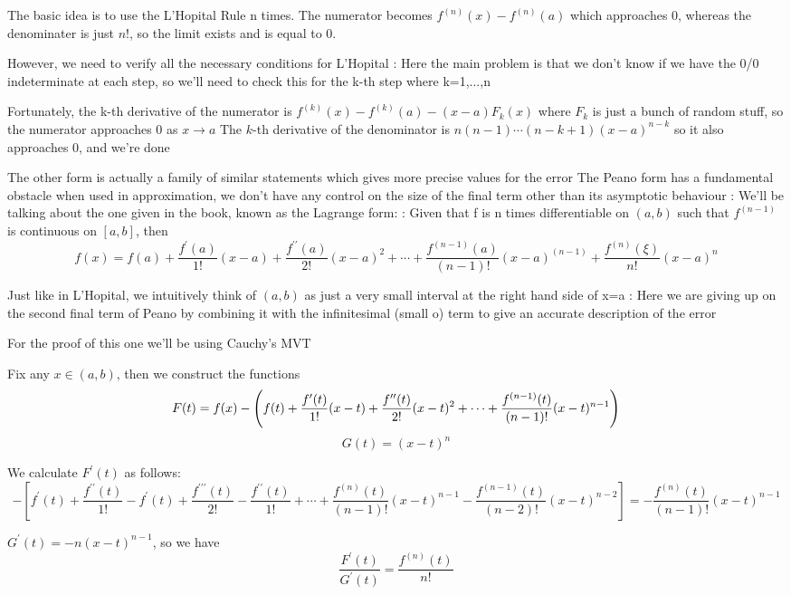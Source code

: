 The basic idea is to use the L'Hopital Rule n times. The numerator becomes $f^{(n)}(x)-f^{(n)}(a)$ which approaches $0$, whereas the denominater is just $n!$, so the limit exists and is equal to $0$.

However, we need to verify all the necessary conditions for L'Hopital
:
Here the main problem is that we don't know if we have the 0/0 indeterminate at each step, so we'll need to check this for the k-th step where k=1,...,n

Fortunately, the k-th derivative of the numerator is
$f^{(k)}(x)-f^{(k)}(a)-(x-a)F_k(x)$ where $F_k$ is just a bunch of random stuff, so the numerator approaches $0$ as $x\to a$
The $k$-th derivative of the denominator is $n(n-1)\cdots(n-k+1)(x-a)^{n-k}$ so it also approaches $0$, and we're done

The other form is actually a family of similar statements which gives more precise values for the error
The Peano form has a fundamental obstacle when used in approximation, we don't have any control on the size of the final term other than its asymptotic behaviour
:
We'll be talking about the one given in the book, known as the Lagrange form:
:
Given that f is n times differentiable on $(a,b)$ such that $f^{(n-1)}$ is continuous on $[a,b]$, then
\[ f(x)=f(a)+\frac{f^\prime(a)}{1!}(x-a)+\frac{f^{\prime\prime}(a)}{2!}(x-a)^2+\cdots+\frac{f^{(n-1)}(a)}{(n-1)!}(x-a)^(n-1)+\frac{f^{(n)}(\xi)}{n!}(x-a)^n \]

Just like in L'Hopital, we intuitively think of $(a,b)$ as just a very small interval at the right hand side of x=a
:
Here we are giving up on the second final term of Peano by combining it with the infinitesimal (small o) term to give an accurate description of the error

For the proof of this one we'll be using Cauchy's MVT

Fix any $x\in(a,b)$, then we construct the functions
\[ F(t)=f(x)-\left(f(t)+\frac{f^\prime(t)}{1!}(x-t)+\frac{f^{\prime\prime}(t)}{2!}(x-t)^2+\cdots+\frac{f^{(n-1)}(t)}{(n-1)!}(x-t)^{n-1}\right) \]
\[ G(t)=(x-t)^n \]

We calculate $F^\prime(t)$ as follows:
\[ -[f^\prime(t)+\frac{f^{\prime\prime}(t)}{1!}-f^\prime(t)+\frac{f^{\prime\prime\prime}(t)}{2!}-\frac{f^{\prime\prime}(t)}{1!}+\cdots+\frac{f^{(n)}(t)}{(n-1)!}(x-t)^{n-1}-\frac{f^{(n-1)}(t)}{(n-2)!}(x-t)^{n-2}]=-\frac{f^{(n)}(t)}{(n-1)!}(x-t)^{n-1} \]

$G^\prime(t)=-n(x-t)^{n-1}$, so we have
\[ \frac{F^\prime(t)}{G^\prime(t)}=\frac{f^{(n)}(t)}{n!} \]


